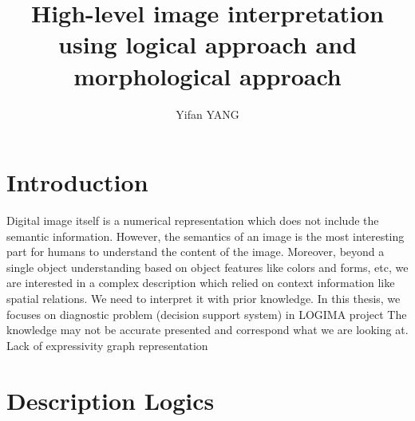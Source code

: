 \documentclass{article}
\title{High-level image interpretation using logical approach and morphological approach}
\author{Yifan YANG}
\begin{document}
 \maketitle
 \section{Introduction}
 Digital image itself is a numerical representation which does not include the semantic information. 
 However, the semantics of an image is the most interesting part for humans to understand the content of the image.
 Moreover, beyond a single object understanding based on object features like colors and forms, etc, we are interested in a complex description which
 relied on context information like spatial relations.
 We need to interpret it with prior knowledge.
 In this thesis, we focuses on diagnostic problem (decision support system) in LOGIMA project
 The knowledge may not be accurate presented and correspond what we are looking at. Lack of expressivity graph representation
 
 \section{Description Logics}
 
 \nocite{*}
 
 
 
\end{document}
